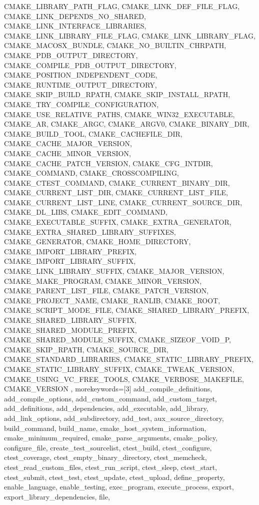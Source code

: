 {{      CMAKE_LIBRARY_PATH_FLAG, CMAKE_LINK_DEF_FILE_FLAG,
      CMAKE_LINK_DEPENDS_NO_SHARED, CMAKE_LINK_INTERFACE_LIBRARIES,
      CMAKE_LINK_LIBRARY_FILE_FLAG, CMAKE_LINK_LIBRARY_FLAG,
      CMAKE_MACOSX_BUNDLE, CMAKE_NO_BUILTIN_CHRPATH,
      CMAKE_PDB_OUTPUT_DIRECTORY, CMAKE_COMPILE_PDB_OUTPUT_DIRECTORY,
      CMAKE_POSITION_INDEPENDENT_CODE, CMAKE_RUNTIME_OUTPUT_DIRECTORY,
      CMAKE_SKIP_BUILD_RPATH, CMAKE_SKIP_INSTALL_RPATH,
      CMAKE_TRY_COMPILE_CONFIGURATION, CMAKE_USE_RELATIVE_PATHS,
      CMAKE_WIN32_EXECUTABLE, CMAKE_AR, CMAKE_ARGC, CMAKE_ARGV0,
      CMAKE_BINARY_DIR, CMAKE_BUILD_TOOL, CMAKE_CACHEFILE_DIR,
      CMAKE_CACHE_MAJOR_VERSION, CMAKE_CACHE_MINOR_VERSION,
      CMAKE_CACHE_PATCH_VERSION, CMAKE_CFG_INTDIR, CMAKE_COMMAND,
      CMAKE_CROSSCOMPILING, CMAKE_CTEST_COMMAND, CMAKE_CURRENT_BINARY_DIR,
      CMAKE_CURRENT_LIST_DIR, CMAKE_CURRENT_LIST_FILE,
      CMAKE_CURRENT_LIST_LINE, CMAKE_CURRENT_SOURCE_DIR, CMAKE_DL_LIBS,
      CMAKE_EDIT_COMMAND, CMAKE_EXECUTABLE_SUFFIX, CMAKE_EXTRA_GENERATOR,
      CMAKE_EXTRA_SHARED_LIBRARY_SUFFIXES, CMAKE_GENERATOR,
      CMAKE_HOME_DIRECTORY, CMAKE_IMPORT_LIBRARY_PREFIX,
      CMAKE_IMPORT_LIBRARY_SUFFIX, CMAKE_LINK_LIBRARY_SUFFIX,
      CMAKE_MAJOR_VERSION, CMAKE_MAKE_PROGRAM, CMAKE_MINOR_VERSION,
      CMAKE_PARENT_LIST_FILE, CMAKE_PATCH_VERSION, CMAKE_PROJECT_NAME,
      CMAKE_RANLIB, CMAKE_ROOT, CMAKE_SCRIPT_MODE_FILE,
      CMAKE_SHARED_LIBRARY_PREFIX, CMAKE_SHARED_LIBRARY_SUFFIX,
      CMAKE_SHARED_MODULE_PREFIX, CMAKE_SHARED_MODULE_SUFFIX,
      CMAKE_SIZEOF_VOID_P, CMAKE_SKIP_RPATH, CMAKE_SOURCE_DIR,
      CMAKE_STANDARD_LIBRARIES, CMAKE_STATIC_LIBRARY_PREFIX,
      CMAKE_STATIC_LIBRARY_SUFFIX, CMAKE_TWEAK_VERSION,
      CMAKE_USING_VC_FREE_TOOLS, CMAKE_VERBOSE_MAKEFILE, CMAKE_VERSION },
    morekeywords=[3]{ add_compile_definitions, add_compile_options,
      add_custom_command, add_custom_target, add_definitions,
      add_dependencies, add_executable, add_library, add_link_options,
      add_subdirectory, add_test, aux_source_directory, build_command,
      build_name, cmake_host_system_information, cmake_minimum_required,
      cmake_parse_arguments, cmake_policy, configure_file,
      create_test_sourcelist, ctest_build, ctest_configure, ctest_coverage,
      ctest_empty_binary_directory, ctest_memcheck,
      ctest_read_custom_files, ctest_run_script, ctest_sleep, ctest_start,
      ctest_submit, ctest_test, ctest_update, ctest_upload,
      define_property, enable_language, enable_testing, exec_program,
      execute_process, export, export_library_dependencies, file,
}}
